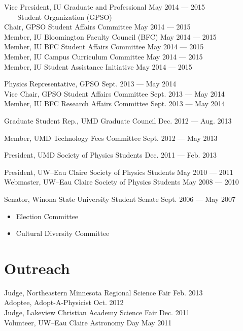 \documentclass[11pt]{cv}
\begin{document}
\begin{cv}
Vice President, IU Graduate and Professional \hfill May 2014 --- 2015 \\
\verb!   ! Student Organization (GPSO) \\
Chair, GPSO Student Affairs Committee \hfill May 2014 --- 2015 \\
Member, IU Bloomington Faculty Council (BFC) \hfill May 2014 --- 2015 \\
Member, IU BFC Student Affairs Committee \hfill May 2014 --- 2015 \\
Member, IU Campus Curriculum Committee \hfill May 2014 --- 2015 \\
Member, IU Student Assistance Initiative \hfill May 2014 --- 2015

Physics Representative, GPSO \hfill Sept. 2013 --- May 2014 \\
Vice Chair, GPSO Student Affairs Committee \hfill Sept. 2013 --- May 2014 \\
Member, IU BFC Research Affairs Committee \hfill Sept. 2013 --- May 2014

Graduate Student Rep., UMD Graduate Council \hfill Dec. 2012 --- Aug. 2013

Member, UMD Technology Fees Committee \hfill Sept. 2012 --- May 2013

President, UMD Society of Physics Students \hfill Dec. 2011 --- Feb. 2013

President, UW--Eau Claire Society of Physics Students \hfill May 2010 --- 2011 \\
Webmaster, UW--Eau Claire Society of Physics Students \hfill May 2008 --- 2010

Senator, Winona State University Student Senate \hfill Sept. 2006 --- May 2007
\begin{itemize}
  \item Election Committee
  \item Cultural Diversity Committee
\end{itemize}


\section{Outreach}
Judge, Northeastern Minnesota Regional Science Fair \hfill Feb. 2013 \\
Adoptee, Adopt-A-Physicist \hfill Oct. 2012 \\
Judge, Lakeview Christian Academy Science Fair \hfill Dec. 2011 \\
Volunteer, UW--Eau Claire Astronomy Day \hfill May 2011



\end{cv}
\end{document}
